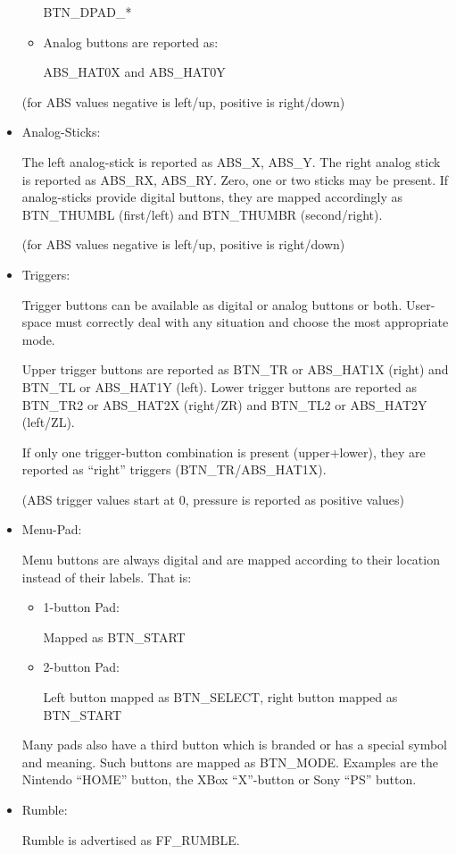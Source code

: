 \documentclass[a4paper,8pt,english]{sphinxmanual}
\begin{document}
\begin{itemize}
\begin{itemize}
BTN\_DPAD\_*

\item {} 
Analog buttons are reported as:

ABS\_HAT0X and ABS\_HAT0Y

\end{itemize}

(for ABS values negative is left/up, positive is right/down)

\item {} 
Analog-Sticks:

The left analog-stick is reported as ABS\_X, ABS\_Y. The right analog stick is
reported as ABS\_RX, ABS\_RY. Zero, one or two sticks may be present.
If analog-sticks provide digital buttons, they are mapped accordingly as
BTN\_THUMBL (first/left) and BTN\_THUMBR (second/right).

(for ABS values negative is left/up, positive is right/down)

\item {} 
Triggers:

Trigger buttons can be available as digital or analog buttons or both. User-
space must correctly deal with any situation and choose the most appropriate
mode.

Upper trigger buttons are reported as BTN\_TR or ABS\_HAT1X (right) and BTN\_TL
or ABS\_HAT1Y (left). Lower trigger buttons are reported as BTN\_TR2 or
ABS\_HAT2X (right/ZR) and BTN\_TL2 or ABS\_HAT2Y (left/ZL).

If only one trigger-button combination is present (upper+lower), they are
reported as ``right'' triggers (BTN\_TR/ABS\_HAT1X).

(ABS trigger values start at 0, pressure is reported as positive values)

\item {} 
Menu-Pad:

Menu buttons are always digital and are mapped according to their location
instead of their labels. That is:
\begin{itemize}
\item {} 
1-button Pad:

Mapped as BTN\_START

\item {} 
2-button Pad:

Left button mapped as BTN\_SELECT, right button mapped as BTN\_START

\end{itemize}

Many pads also have a third button which is branded or has a special symbol
and meaning. Such buttons are mapped as BTN\_MODE. Examples are the Nintendo
``HOME'' button, the XBox ``X''-button or Sony ``PS'' button.

\item {} 
Rumble:

Rumble is advertised as FF\_RUMBLE.

\end{itemize}
\end{document}
